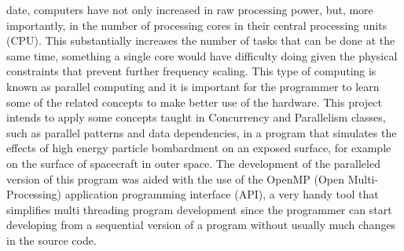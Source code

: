  date, computers have not only increased in raw processing power, but, more importantly, in the number of processing cores in their central processing units (CPU). This substantially increases the number of tasks that can be done at the same time, something a single core would have difficulty doing given the physical constraints that prevent further frequency scaling. This type of computing is known as parallel computing and it is important for the programmer to learn some of the related concepts to make better use of the hardware. This project intends to apply some concepts taught in Concurrency and Parallelism classes, such as parallel patterns and data dependencies, in a program that simulates the effects of high energy particle bombardment on an exposed surface, for example on the surface of spacecraft in outer space. The development of the paralleled version of this program was aided with the use of the OpenMP (Open Multi-Processing) application programming interface (API), a very handy tool that simplifies multi threading program development since the programmer can start developing from a sequential version of a program without usually much changes in the source code.

